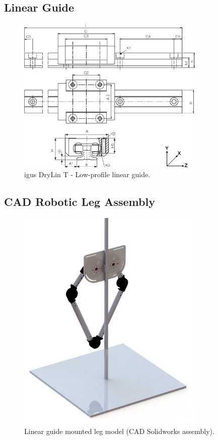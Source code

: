 \subsection{Linear Guide}
\begin{figure}
\centering
\includegraphics[width=0.8\textwidth]{images/mechanical/drylin-linear-guide.png} 
\caption{igus DryLin T - Low-profile linear guide.}
\label{fig:drylin-linear-guide}
\end{figure}

\subsection{CAD Robotic Leg Assembly}
\begin{figure}
\centering
\includegraphics[width=0.8\textwidth]{images/mechanical/back-shot.png} 
\caption{Linear guide mounted leg model (CAD Solidworks assembly).}
\label{fig:Linear guide mounted leg model}
\end{figure}



